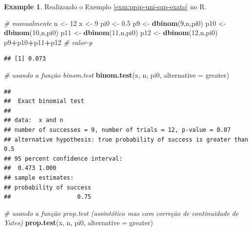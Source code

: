 \documentclass[
]{book}
\newenvironment{Shaded}{\begin{snugshade}}{\end{snugshade}}
\newcommand{\CommentTok}[1]{\textcolor[rgb]{0.56,0.35,0.01}{\textit{#1}}}
\newcommand{\DataTypeTok}[1]{\textcolor[rgb]{0.13,0.29,0.53}{#1}}
\newcommand{\DecValTok}[1]{\textcolor[rgb]{0.00,0.00,0.81}{#1}}
\newcommand{\FloatTok}[1]{\textcolor[rgb]{0.00,0.00,0.81}{#1}}
\newcommand{\KeywordTok}[1]{\textcolor[rgb]{0.13,0.29,0.53}{\textbf{#1}}}
\newcommand{\NormalTok}[1]{#1}
\newcommand{\OperatorTok}[1]{\textcolor[rgb]{0.81,0.36,0.00}{\textbf{#1}}}
\newcommand{\StringTok}[1]{\textcolor[rgb]{0.31,0.60,0.02}{#1}}
\theoremstyle{definition}
\theoremstyle{definition}
\newtheorem{example}{Example}[chapter]
\theoremstyle{definition}
\theoremstyle{remark}
\begin{document}
\begin{example}
\protect\hypertarget{exm:prop-teste-exato-r}{}{\label{exm:prop-teste-exato-r} }Realizando o Exemplo \ref{exm:prop-uni-sup-exato} no R.
\end{example}

\begin{Shaded}
\begin{Highlighting}[]
\CommentTok{\# manualmente}
\NormalTok{n \textless{}{-}}\StringTok{ }\DecValTok{12}
\NormalTok{x \textless{}{-}}\StringTok{ }\DecValTok{9}
\NormalTok{pi0 \textless{}{-}}\StringTok{ }\FloatTok{0.5}
\NormalTok{p9 \textless{}{-}}\StringTok{ }\KeywordTok{dbinom}\NormalTok{(}\DecValTok{9}\NormalTok{,n,pi0)}
\NormalTok{p10 \textless{}{-}}\StringTok{ }\KeywordTok{dbinom}\NormalTok{(}\DecValTok{10}\NormalTok{,n,pi0)}
\NormalTok{p11 \textless{}{-}}\StringTok{ }\KeywordTok{dbinom}\NormalTok{(}\DecValTok{11}\NormalTok{,n,pi0)}
\NormalTok{p12 \textless{}{-}}\StringTok{ }\KeywordTok{dbinom}\NormalTok{(}\DecValTok{12}\NormalTok{,n,pi0)}
\NormalTok{p9}\OperatorTok{+}\NormalTok{p10}\OperatorTok{+}\NormalTok{p11}\OperatorTok{+}\NormalTok{p12 }\CommentTok{\# valor{-}p}
\end{Highlighting}
\end{Shaded}

\begin{verbatim}
## [1] 0.073
\end{verbatim}

\begin{Shaded}
\begin{Highlighting}[]
\CommentTok{\# usando a função binom.test}
\KeywordTok{binom.test}\NormalTok{(x, n, pi0, }\DataTypeTok{alternative =} \StringTok{\textquotesingle{}greater\textquotesingle{}}\NormalTok{)}
\end{Highlighting}
\end{Shaded}

\begin{verbatim}
## 
##  Exact binomial test
## 
## data:  x and n
## number of successes = 9, number of trials = 12, p-value = 0.07
## alternative hypothesis: true probability of success is greater than 0.5
## 95 percent confidence interval:
##  0.473 1.000
## sample estimates:
## probability of success 
##                   0.75
\end{verbatim}

\begin{Shaded}
\begin{Highlighting}[]
\CommentTok{\# usando a função prop.test (assintótico mas com correção de continuidade de Yates)}
\KeywordTok{prop.test}\NormalTok{(x, n, pi0, }\DataTypeTok{alternative =} \StringTok{\textquotesingle{}greater\textquotesingle{}}\NormalTok{)}
\end{Highlighting}
\end{Shaded}
\end{document}
